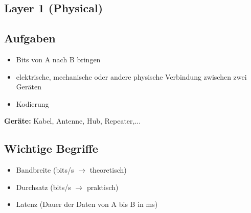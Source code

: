 \subsection{Layer 1 (Physical)}
\subsection*{Aufgaben}
\begin{itemize}
	\item Bits von A nach B bringen
	\item elektrische, mechanische oder andere physische Verbindung zwischen zwei Geräten
	\item Kodierung
\end{itemize}
\textbf{Geräte:} Kabel, Antenne, Hub, Repeater,...

\subsection*{Wichtige Begriffe}
\begin{itemize}
	\item Bandbreite (bits/s $\rightarrow$ theoretisch)
	\item Durchsatz (bits/s $\rightarrow$ praktisch)
	\item Latenz (Dauer der Daten von A bis B in ms)
\end{itemize}

